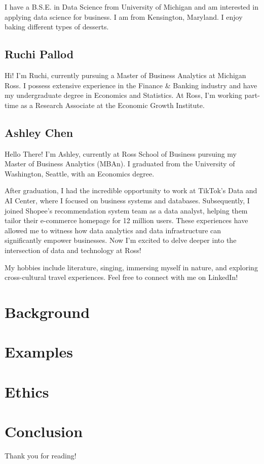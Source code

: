 \documentclass[
]{article}
\begin{document}
I have a B.S.E. in Data Science from University of Michigan and am interested in applying data science for business. I am from Kensington, Maryland. I enjoy baking different types of desserts.

\hypertarget{ruchi-pallod}{%
\subsection{Ruchi Pallod}\label{ruchi-pallod}}

Hi! I'm Ruchi, currently pursuing a Master of Business Analytics at Michigan Ross. I possess extensive experience in the Finance \& Banking industry and have my undergraduate degree in Economics and Statistics. At Ross, I'm working part-time as a Research Associate at the Economic Growth Institute.

\hypertarget{ashley-chen}{%
\subsection{Ashley Chen}\label{ashley-chen}}

Hello There! I'm Ashley, currently at Ross School of Business pursuing my Master of Business Analytics (MBAn). I graduated from the University of Washington, Seattle, with an Economics degree.

After graduation, I had the incredible opportunity to work at TikTok's Data and AI Center, where I focused on business systems and databases. Subsequently, I joined Shopee's recommendation system team as a data analyst, helping them tailor their e-commerce homepage for 12 million users. These experiences have allowed me to witness how data analytics and data infrastructure can significantly empower businesses. Now I'm excited to delve deeper into the intersection of data and technology at Ross!

My hobbies include literature, singing, immersing myself in nature, and exploring cross-cultural travel experiences. Feel free to connect with me on LinkedIn!

\hypertarget{background}{%
\section*{Background}\label{background}}

\hypertarget{examples}{%
\section*{Examples}\label{examples}}

\hypertarget{ethics}{%
\section*{Ethics}\label{ethics}}

\hypertarget{conclusion}{%
\section{Conclusion}\label{conclusion}}

Thank you for reading!
\end{document}
